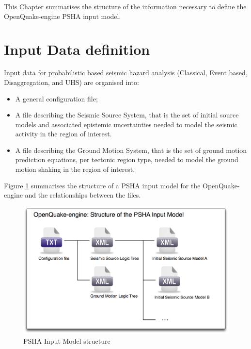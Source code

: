 This Chapter summarises the structure of the information necessary 
to define the OpenQuake-engine PSHA input model. 
\section{Input Data definition}
Input data for probabilistic based seismic hazard analysis (Classical, 
Event based, Disaggregation, and UHS) are organised into:
\begin{itemize}
\item A general configuration file;
\item A file describing the Seismic Source System, that is the set of 
    initial source models and associated epistemic uncertainties needed 
    to model the seismic activity in the region of interest.
\item A file describing the Ground Motion System, that is the set of ground 
    motion prediction equations, per tectonic region type, needed to model 
    the ground motion shaking in the region of interest.
\end{itemize}

Figure \ref{fig:psha_input} summarises the structure of a PSHA input model
for the OpenQuake-engine and the relationships between the files.
\begin{figure}[!ht]
\centering
\includegraphics[width=14cm]{./figures/hazard/psha_input_structure.eps}
\caption{PSHA Input Model structure}
\label{fig:psha_input}
\end{figure}

